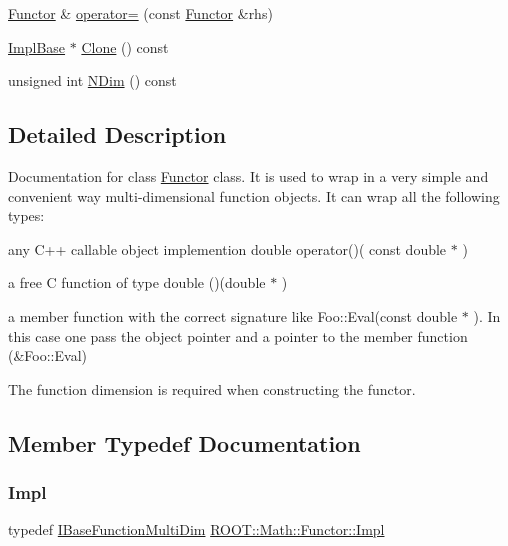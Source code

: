 \begin{DoxyCompactItemize}
\item 
\mbox{\hyperlink{classROOT_1_1Math_1_1Functor}{Functor}} \& \mbox{\hyperlink{classROOT_1_1Math_1_1Functor_a24bd9cdf7e31e443bff64c5fb4378c99}{operator=}} (const \mbox{\hyperlink{classROOT_1_1Math_1_1Functor}{Functor}} \&rhs)
\item 
\mbox{\hyperlink{classROOT_1_1Math_1_1Functor_acc5dacb213f26296122e95138f5153b3}{Impl\+Base}} $\ast$ \mbox{\hyperlink{classROOT_1_1Math_1_1Functor_a989f9b6dd160ebe03911cdee00dacaad}{Clone}} () const
\item 
unsigned int \mbox{\hyperlink{classROOT_1_1Math_1_1Functor_a2544e2ed3c6a0420084c7b08eb3c3130}{N\+Dim}} () const
\end{DoxyCompactItemize}


\subsection{Detailed Description}
Documentation for class \mbox{\hyperlink{classROOT_1_1Math_1_1Functor}{Functor}} class. It is used to wrap in a very simple and convenient way multi-\/dimensional function objects. It can wrap all the following types\+: 
\begin{DoxyItemize}
\item any C++ callable object implemention double operator()( const double $\ast$  ) 
\item a free C function of type double ()(double $\ast$ ) 
\item a member function with the correct signature like Foo\+::\+Eval(const double $\ast$ ). In this case one pass the object pointer and a pointer to the member function (\&Foo\+::\+Eval) 
\end{DoxyItemize}The function dimension is required when constructing the functor. 

\subsection{Member Typedef Documentation}
\mbox{\label{classROOT_1_1Math_1_1Functor_aef374d72e63fb0fea13a8cc3d4f2091b}} 
\subsubsection{\texorpdfstring{Impl}{Impl}\hspace{0.1cm}{\footnotesize\ttfamily [1/3]}}
{\footnotesize\ttfamily typedef \mbox{\hyperlink{classROOT_1_1Math_1_1IBaseFunctionMultiDim}{I\+Base\+Function\+Multi\+Dim}} \mbox{\hyperlink{classROOT_1_1Math_1_1Functor_aef374d72e63fb0fea13a8cc3d4f2091b}{R\+O\+O\+T\+::\+Math\+::\+Functor\+::\+Impl}}}

